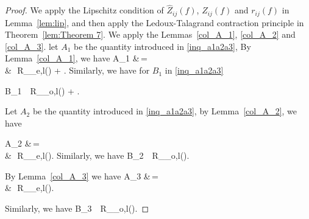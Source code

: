 \documentclass[twoside,11pt]{article}
\begin{document}
\begin{proof}

We apply the Lipschitz condition of $\hat Z_{ij}(f)$, $Z_{ij}(f)$ and $r_{ij}(f)$ in Lemma~\ref{lem:lip}, and then apply the 
Ledoux-Talagrand contraction principle in Theorem~\ref{lem:Theorem 7}. 
We apply the Lemmas~\ref{col_A_1}, \ref{col_A_2} and \ref{col_A_3}. 
let $A_1$ be the quantity introduced in \eqref{inq_a1a2a3},
By Lemma~\ref{col_A_1}, we have 
\bea 
A_1 &\,=\,  \\
&\,\le\, R_{_{e,l}}(\gF \cap {})  + .
\bea
Similarly,  we have for  $B_1$ in \eqref{inq_a1a2a3}

\bea
B_1 \,\le\, R_{_{o,l}}(\gF \cap {})  + .
\bea 

Let $A_2$ be the quantity introduced in \eqref{inq_a1a2a3}, by Lemma~\ref{col_A_2}, we have 

\bea 
A_2 &\,=\,  \\
&\,\le\,  R_{_{e,l}}(\gF \cap {}).
\bea
Similarly, we have
\bea
B_2 \,\le\,  R_{_{o,l}}(\gF \cap {}). 
\bea  


By Lemma~\ref{col_A_3}  we have 
\beq 
A_3 &\,=\,  \\
&\,\le\, R_{_{e,l}}(\gF \cap {}).
\beq 

Similarly, we have 
\bea 
B_3 \,\le\,  R_{_{o,l}}(\gF \cap {}). 
\bea  


\end{proof}
\end{document}
